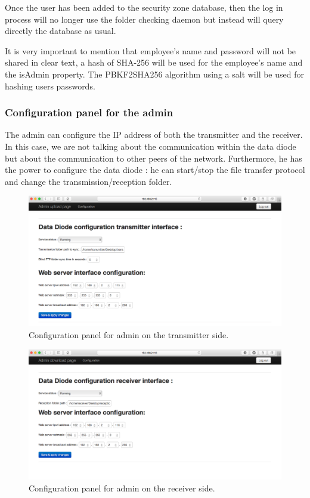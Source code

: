 \documentclass[a4paper,10pt]{article}
\begin{document}
Once the user has been added to the security zone database, then the log in process will no longer use the folder checking daemon but instead will query directly the database as usual.

It is very important to mention that employee's name and password will not be shared in clear text, a hash of SHA-256 will be used for the employee's name and the isAdmin property. The  PBKF2SHA256 algorithm using a salt will be used for hashing users passwords.

\subsubsection{Configuration panel for the admin}
The admin can configure the IP address of both the transmitter and the receiver. In this case, we are not talking about the communication within the data diode but about the communication to other peers of the network. Furthermore, he has the power to configure the data diode : he can start/stop the file transfer protocol and change the transmission/reception folder.

\begin{figure}[!h]
\centering
\includegraphics[scale=0.35]{images/admin-configTrans.png}
\caption{Configuration panel for admin on the transmitter side.}
\label{fig:configadminpagetrans}
\end{figure}
\bigskip
\begin{figure}[!h]
\centering
\includegraphics[scale=0.35]{images/admin-configReceiv.png}
\caption{Configuration panel for admin on the receiver side.}
\label{fig:configadminpagereceiv}
\end{figure}
\end{document}
